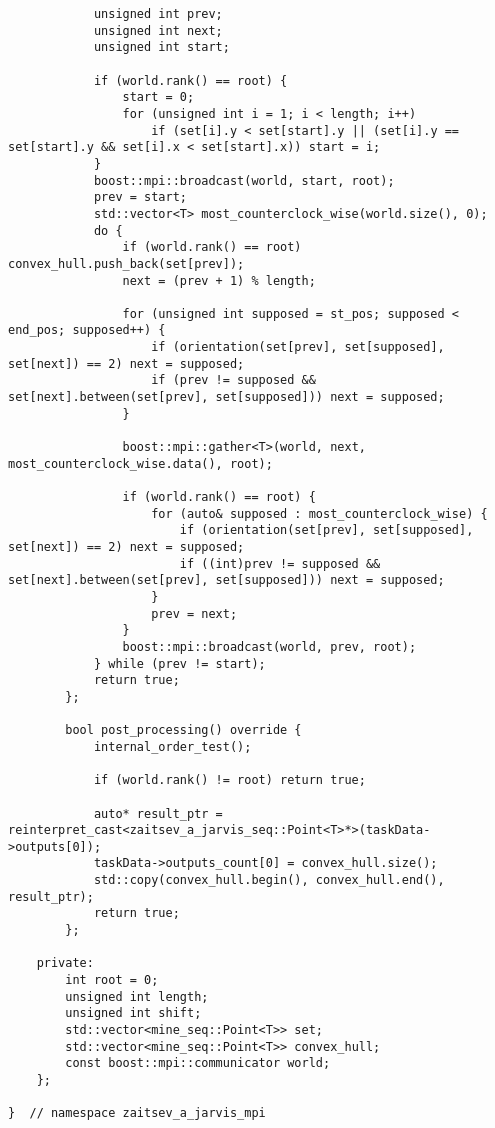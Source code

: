 \documentclass[12pt]{article}
\begin{document}
\begin{lstlisting}
			unsigned int prev;
			unsigned int next;
			unsigned int start;

			if (world.rank() == root) {
				start = 0;
				for (unsigned int i = 1; i < length; i++)
					if (set[i].y < set[start].y || (set[i].y == set[start].y && set[i].x < set[start].x)) start = i;
			}
			boost::mpi::broadcast(world, start, root);
			prev = start;
			std::vector<T> most_counterclock_wise(world.size(), 0);
			do {
				if (world.rank() == root) convex_hull.push_back(set[prev]);
				next = (prev + 1) % length;

				for (unsigned int supposed = st_pos; supposed < end_pos; supposed++) {
					if (orientation(set[prev], set[supposed], set[next]) == 2) next = supposed;
					if (prev != supposed && set[next].between(set[prev], set[supposed])) next = supposed;
				}

				boost::mpi::gather<T>(world, next, most_counterclock_wise.data(), root);

				if (world.rank() == root) {
					for (auto& supposed : most_counterclock_wise) {
						if (orientation(set[prev], set[supposed], set[next]) == 2) next = supposed;
						if ((int)prev != supposed && set[next].between(set[prev], set[supposed])) next = supposed;
					}
					prev = next;
				}
				boost::mpi::broadcast(world, prev, root);
			} while (prev != start);
			return true;
		};

		bool post_processing() override {
			internal_order_test();

			if (world.rank() != root) return true;

			auto* result_ptr = reinterpret_cast<zaitsev_a_jarvis_seq::Point<T>*>(taskData->outputs[0]);
			taskData->outputs_count[0] = convex_hull.size();
			std::copy(convex_hull.begin(), convex_hull.end(), result_ptr);
			return true;
		};

	private:
		int root = 0;
		unsigned int length;
		unsigned int shift;
		std::vector<mine_seq::Point<T>> set;
		std::vector<mine_seq::Point<T>> convex_hull;
		const boost::mpi::communicator world;
	};

}  // namespace zaitsev_a_jarvis_mpi
\end{lstlisting}
\end{document}
